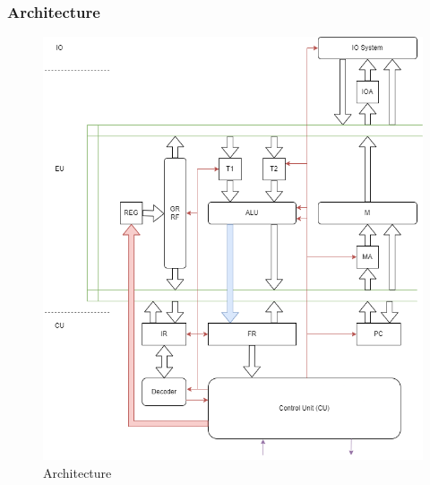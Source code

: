 \begin{frame}
    \frametitle{Architecture}
    \begin{figure}
        \centering
        \includegraphics[height=0.7\textheight]{media/architecture.png}
        \caption{Architecture}
    \end{figure}
\end{frame}